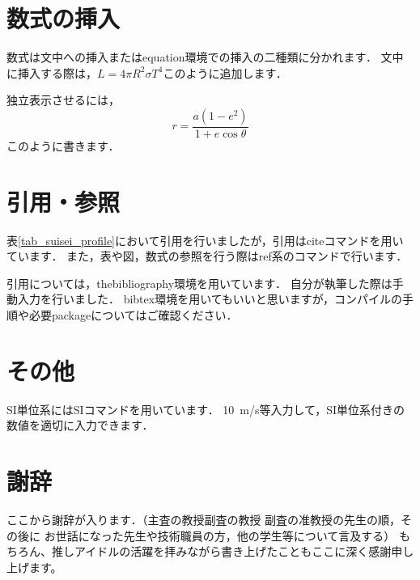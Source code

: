 \documentclass[a4paper, 11pt]{report}
\newcommand{\tableref}[1]{表\ref{#1}}
\begin{document}
\section{数式の挿入}
数式は文中への挿入またはequation環境での挿入の二種類に分かれます．
文中に挿入する際は，\(L = 4\pi R^2 \sigma T^4\)このように追加します．

独立表示させるには，
\begin{equation}
    r = \frac{a(1 - e^2)}{1 + e \cos\theta}
\end{equation}
このように書きます．

\section{引用・参照}
\tableref{tab_suisei_profile}において引用を行いましたが，引用はciteコマンドを用いています．
また，表や図，数式の参照を行う際はref系のコマンドで行います．

引用については，thebibliography環境を用いています．
自分が執筆した際は手動入力を行いました．
bibtex環境を用いてもいいと思いますが，コンパイルの手順や必要packageについてはご確認ください．

\section{その他}
SI単位系にはSIコマンドを用いています．
\SI{10}{m/s}等入力して，SI単位系付きの数値を適切に入力できます．



\newpage
{} %
\section*{\fontsize{18pt}{22pt}\selectfont 謝辞} %
ここから謝辞が入ります．（主査の教授\rightarrow 副査の教授 \rightarrow 副査の准教授の先生の順，その後に
お世話になった先生や技術職員の方，他の学生等について言及する）
もちろん、推しアイドルの活躍を拝みながら書き上げたこともここに深く感謝申し上げます。
\end{document}
